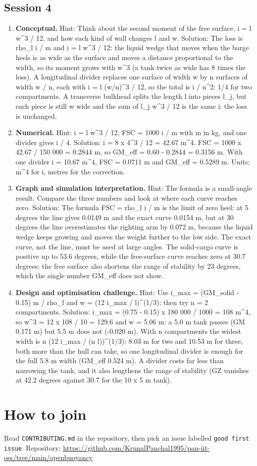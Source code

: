 \documentclass[11pt,a4paper]{article}
\begin{document}
\subsection*{Session 4}
\begin{enumerate}[nosep]
\item \textbf{Conceptual.} Hint: Think about the second moment of the free surface, i = l w\textasciicircum{}3 / 12, and how each kind of wall changes l and w. Solution: The loss is rho\_l i / m and i = l w\textasciicircum{}3 / 12: the liquid wedge that moves when the barge heels is as wide as the surface and moves a distance proportional to the width, so its moment grows with w\textasciicircum{}3 (a tank twice as wide has 8 times the loss). A longitudinal divider replaces one surface of width w by n surfaces of width w / n, each with i = l (w/n)\textasciicircum{}3 / 12, so the total is i / n\textasciicircum{}2: 1/4 for two compartments. A transverse bulkhead splits the length l into pieces l\_j, but each piece is still w wide and the sum of l\_j w\textasciicircum{}3 / 12 is the same i: the loss is unchanged.
\item \textbf{Numerical.} Hint: i = l w\textasciicircum{}3 / 12, FSC = 1000 i / m with m in kg, and one divider gives i / 4. Solution: i = 8 x 4\textasciicircum{}3 / 12 = 42.67 m\textasciicircum{}4. FSC = 1000 x 42.67 / 150 000 = 0.2844 m, so GM\_eff = 0.60 - 0.2844 = 0.3156 m. With one divider i = 10.67 m\textasciicircum{}4, FSC = 0.0711 m and GM\_eff = 0.5289 m. Units: m\textasciicircum{}4 for i, metres for the correction.
\item \textbf{Graph and simulation interpretation.} Hint: The formula is a small-angle result. Compare the three numbers and look at where each curve reaches zero. Solution: The formula FSC = rho\_l i / m is the limit of zero heel: at 5 degrees the line gives 0.0149 m and the exact curve 0.0154 m, but at 30 degrees the line overestimates the righting arm by 0.072 m, because the liquid wedge keeps growing and moves the weight further to the low side. The exact curve, not the line, must be used at large angles. The solid-cargo curve is positive up to 53.6 degrees, while the free-surface curve reaches zero at 30.7 degrees: the free surface also shortens the range of stability by 23 degrees, which the single number GM\_eff does not show.
\item \textbf{Design and optimisation challenge.} Hint: Use i\_max = (GM\_solid - 0.15) m / rho\_l and w = (12 i\_max / l)\textasciicircum{}(1/3); then try n = 2 compartments. Solution: i\_max = (0.75 - 0.15) x 180 000 / 1000 = 108 m\textasciicircum{}4, so w\textasciicircum{}3 = 12 x 108 / 10 = 129.6 and w = 5.06 m: a 5.0 m tank passes (GM 0.171 m) but 5.5 m does not (-0.020 m). With n compartments the widest width is n (12 i\_max / (n l))\textasciicircum{}(1/3): 8.03 m for two and 10.53 m for three, both more than the hull can take, so one longitudinal divider is enough for the full 5.8 m width (GM\_eff 0.524 m). A divider costs far less than narrowing the tank, and it also lengthens the range of stability (GZ vanishes at 42.2 degrees against 30.7 for the 10 x 5 m tank).
\end{enumerate}

\section{How to join}
Read \texttt{CONTRIBUTING.md} in the repository, then pick an issue labelled \texttt{good first issue}. Repository: \url{https://github.com/KrunalPanchal1995/pan-iit-oss/tree/main/openbuoyancy}
\end{document}
